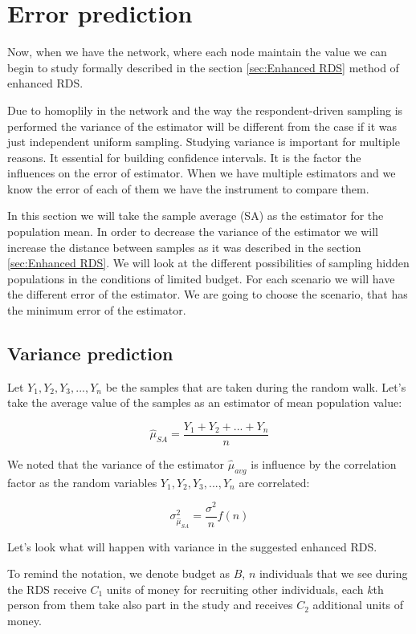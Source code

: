 \documentclass[12pt]{report}
\begin{document}
\section{Error prediction}

Now, when we have the network, where each node maintain the value we can begin to study formally described in the section 
\ref{sec:Enhanced RDS} method of enhanced RDS.

Due to homoplily in the network and the way the respondent-driven sampling is performed the variance of the estimator will be different from the case if it was just independent uniform sampling. Studying variance is important for multiple reasons. It essential for building confidence intervals. It is the factor the influences on the error of estimator. When we have multiple estimators and we know the error of each of them we have the instrument to compare them.


In this section we will take the sample average (SA) as the estimator for the population mean. In order to decrease the variance of the estimator we will increase the distance between samples as it was described in the section \ref{sec:Enhanced RDS}. We will look at the different possibilities of sampling hidden populations in the conditions of limited budget. For each scenario we will have the different error of the estimator. We are going to choose the scenario, that has the minimum error of the estimator. 

\subsection{Variance prediction}

Let $Y_1, Y_2, Y_3,..., Y_n$ be the samples that are taken during the random walk. Let's take the average value of the samples as an estimator of mean population value:

$$ \widehat{\mu}_{SA} = \frac{Y_1 + Y_2 + ... + Y_n}{n}$$

We noted that the variance of the estimator $\widehat{\mu}_{avg}$ is influence by the correlation factor as the random variables $Y_1, Y_2, Y_3,..., Y_n$ are correlated:

$$ \sigma^2_{\hat{\mu}_{SA}} = \frac{\sigma^2}{n} f(n)$$

Let's look what will happen with variance in the suggested enhanced RDS.

To remind the notation, we denote budget as $B$, $n$ individuals that we see during the RDS receive $C_1$ units of money for recruiting other individuals, each $k$th person from them take also part in the study and receives $C_2$ additional units of money. 
\end{document}
